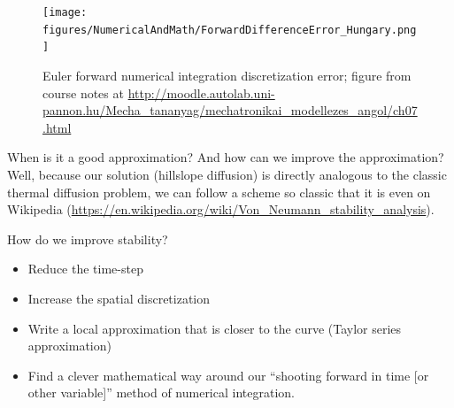 \documentclass[a4paper,10pt]{scrartcl}
\begin{document}
\begin{figure}
\begin{center}
\texttt{[image: figures/NumericalAndMath/ForwardDifferenceError\_Hungary.png]}
\end{center}
 \caption{Euler forward numerical integration discretization error; figure from course notes at \url{http://moodle.autolab.uni-pannon.hu/Mecha_tananyag/mechatronikai_modellezes_angol/ch07.html}}
\end{figure}

When is it a good approximation? And how can we improve the approximation? Well, because our solution (hillslope diffusion) is directly analogous to the classic thermal diffusion problem, we can follow a scheme so classic that it is even on Wikipedia (\url{https://en.wikipedia.org/wiki/Von_Neumann_stability_analysis}).

How do we improve stability?
\begin{itemize}
 \item Reduce the time-step
 \item Increase the spatial discretization
 \item Write a local approximation that is closer to the curve (Taylor series approximation)
 \item Find a clever mathematical way around our ``shooting forward in time [or other variable]'' method of numerical integration.
\end{itemize}
\end{document}
